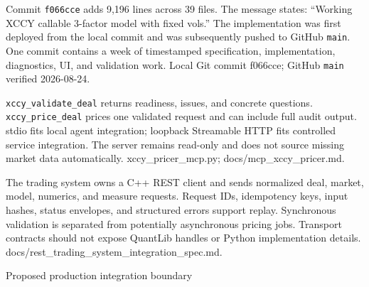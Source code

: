 
{Commit \texttt{f066cce} adds 9,196 lines across 39 files.}
{The message states: ``Working XCCY callable 3-factor model with fixed vols.''}
{The implementation was first deployed from the local commit and was subsequently pushed to GitHub \texttt{main}.}
{One commit contains a week of timestamped specification, implementation, diagnostics, UI, and validation work.}
{Local Git commit f066cce; GitHub \texttt{main} verified 2026-08-24.}

{\texttt{xccy\_validate\_deal} returns readiness, issues, and concrete questions.}
{\texttt{xccy\_price\_deal} prices one validated request and can include full audit output.}
{stdio fits local agent integration; loopback Streamable HTTP fits controlled service integration.}
{The server remains read-only and does not source missing market data automatically.}
{xccy\_pricer\_mcp.py; docs/mcp\_xccy\_pricer.md.}

{The trading system owns a C++ REST client and sends normalized deal, market, model, numerics, and measure requests.}
{Request IDs, idempotency keys, input hashes, status envelopes, and structured errors support replay.}
{Synchronous validation is separated from potentially asynchronous pricing jobs.}
{Transport contracts should not expose QuantLib handles or Python implementation details.}
{docs/rest\_trading\_system\_integration\_spec.md.}

\begin{frame}{Proposed production integration boundary}
  \centering
  \vspace{7mm}
\end{frame}

